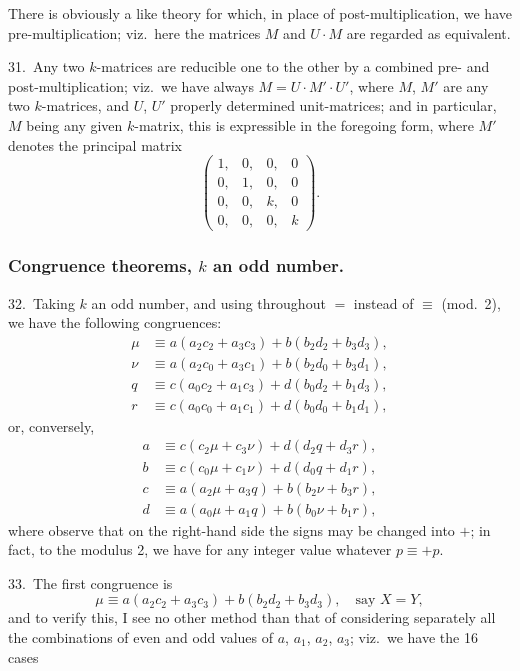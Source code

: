 \documentclass[11pt,a4paper]{article}
\theoremstyle{definition}
\begin{document}
There is obviously a like theory for which, in place of post-multiplication, we have pre-multiplication; viz.\ here the matrices $M$ and $U \cdot M$ are regarded as equivalent.

\medskip

31.\ Any two $k$-matrices are reducible one to the other by a combined pre- and post-multiplication; viz.\ we have always $M = U \cdot M' \cdot U'$, where $M$, $M'$ are any two $k$-matrices, and $U$, $U'$ properly determined unit-matrices; and in particular, $M$ being any given $k$-matrix, this is expressible in the foregoing form, where $M'$ denotes the principal matrix
\[
\begin{pmatrix}
1, & 0, & 0, & 0\\
0, & 1, & 0, & 0\\
0, & 0, & k, & 0\\
0, & 0, & 0, & k
\end{pmatrix}.
\]

\subsubsection*{Congruence theorems, $k$ an odd number.}

\medskip

32.\ Taking $k$ an odd number, and using throughout $=$ instead of $\equiv$ (mod.~2), we have the following congruences:
\begin{align*}
\mu &\equiv a(a_2c_2 + a_3c_3) + b(b_2d_2 + b_3d_3),\\
\nu &\equiv a(a_2c_0 + a_3c_1) + b(b_2d_0 + b_3d_1),\\
q &\equiv c(a_0c_2 + a_1c_3) + d(b_0d_2 + b_1d_3),\\
r &\equiv c(a_0c_0 + a_1c_1) + d(b_0d_0 + b_1d_1),
\end{align*}
or, conversely,
\begin{align*}
a &\equiv c(c_2\mu + c_3\nu) + d(d_2q + d_3r),\\
b &\equiv c(c_0\mu + c_1\nu) + d(d_0q + d_1r),\\
c &\equiv a(a_2\mu + a_3q) + b(b_2\nu + b_3r),\\
d &\equiv a(a_0\mu + a_1q) + b(b_0\nu + b_1r),
\end{align*}
where observe that on the right-hand side the signs may be changed into $+$; in fact, to the modulus 2, we have for any integer value whatever $p \equiv +p$.

\medskip

33.\ The first congruence is
\[
\mu \equiv a(a_2c_2 + a_3c_3) + b(b_2d_2 + b_3d_3), \quad \text{say } X = Y,
\]
and to verify this, I see no other method than that of considering separately all the combinations of even and odd values of $a$, $a_1$, $a_2$, $a_3$; viz.\ we have the 16 cases
\end{document}

